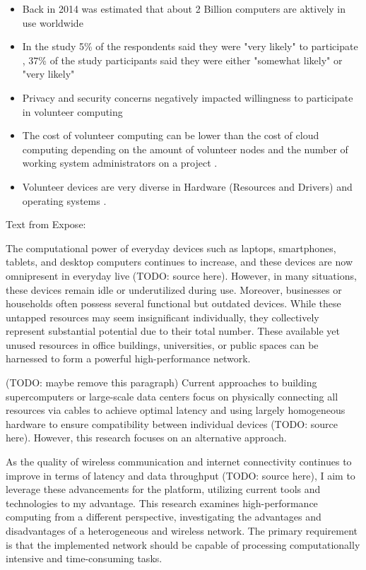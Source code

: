 \begin{itemize}
    \item Back in 2014 was estimated that about 2 Billion computers are aktively in use worldwide \cite{intro:computersAmount,relatedwork:boinc1}
    \item In the study 5\% of the respondents said they were "very likely" to participate \cite{intro:volunteerStudy,relatedwork:boinc1}, 37\% of the study participants said they were either "somewhat likely" or "very likely" \cite{intro:volunteerStudy}
    \item Privacy and security concerns negatively impacted willingness to participate in volunteer computing \cite{intro:volunteerStudy}
    \item The cost of volunteer computing can be lower than the cost of cloud computing depending on the amount of volunteer nodes and the number of working system administrators on a project \cite{intro:costAnalysis}.
    \item Volunteer devices are very diverse in Hardware (Resources and Drivers) and operating systems \cite{intro:diverseDevices}. 
\end{itemize}

Text from Expose:

The computational power of everyday devices such as laptops, smartphones, tablets, and desktop computers continues to increase, and these devices are now omnipresent in everyday live (TODO: source here). However, in many situations, these devices remain idle or underutilized during use. Moreover, businesses or households often possess several functional but outdated devices. While these untapped resources may seem insignificant individually, they collectively represent substantial potential due to their total number. These available yet unused resources in office buildings, universities, or public spaces can be harnessed to form a powerful high-performance network.

(TODO: maybe remove this paragraph) Current approaches to building supercomputers or large-scale data centers focus on physically connecting all resources via cables to achieve optimal latency and using largely homogeneous hardware to ensure compatibility between individual devices (TODO: source here). However, this research focuses on an alternative approach.

As the quality of wireless communication and internet connectivity continues to improve in terms of latency and data throughput (TODO: source here), I aim to leverage these advancements for the platform, utilizing current tools and technologies to my advantage. This research examines high-performance computing from a different perspective, investigating the advantages and disadvantages of a heterogeneous and wireless network. The primary requirement is that the implemented network should be capable of processing computationally intensive and time-consuming tasks.

